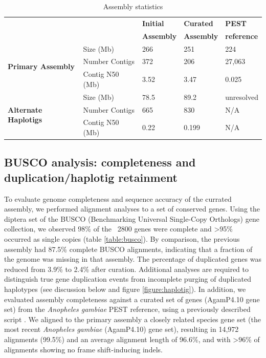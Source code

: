 \begin{table}[htbp!]
\caption{Assembly statistics}\label{table:assemblydata}
\begin{center}
\begin{tabular}{ | l | l | l | l | l |}
\hline
\multicolumn{2}{|c|}{} & \textbf{Initial} & \textbf{Curated} & \textbf{PEST} \\
\multicolumn{2}{|c|}{} & \textbf{Assembly} & \textbf{Assembly} & \textbf{reference} \\
\hline
\multirow{3}{5em}{\textbf{Primary Assembly}}
& Size (Mb) & 266 & 251 & 224 \\
\cline{2-5}
& Number Contigs & 372 & 206 & 27,063 \\
\cline{2-5}
& Contig N50 (Mb) & 3.52	& 3.47	& 0.025 \\
\hline%
\multirow{3}{5em}{\textbf{Alternate Haplotigs}}
& Size (Mb) & 78.5 & 	89.2	& unresolved \\
\cline{2-5}
& Number Contigs & 665 &	830& 	N/A \\
\cline{2-5}
& Contig N50 (Mb) & 0.22	& 0.199	& N/A \\
\hline
\end{tabular}
\end{center}
\end{table}




\subsection{BUSCO analysis: completeness and duplication/haplotig retainment}

\par{
To evaluate genome completeness and sequence accuracy of the currated assembly, we performed alignment analyses to a set of conserved genes. Using the diptera set of the BUSCO (Benchmarking Universal Single-Copy Orthologs) gene collection, we observed 98\% of the ~2800 genes were complete and >95\% occurred as single copies (table \ref{table:busco}). By comparison, the previous assembly had 87.5\% complete BUSCO alignments, indicating that a fraction of the genome was missing in that assembly. The percentage of duplicated genes was reduced from 3.9\% to 2.4\% after curation.  Additional analyses are required to distinguish true gene duplication events from incomplete purging of duplicated haplotypes (see discussion below and figure \ref{figure:haplotig}). In addition, we evaluated assembly completeness against a curated set of genes (AgamP4.10 gene set) from the \textit{Anopheles gambiae} PEST reference, using a previously described script \cite{avian}. We aligned to the primary assembly a closely related species gene set (the most recent \textit{Anopheles gambiae} (AgamP4.10) gene set), resulting in 14,972 alignments (99.5\%) and an average alignment length of 96.6\%, and with >96\% of alignments showing no frame shift-inducing indels.
}


